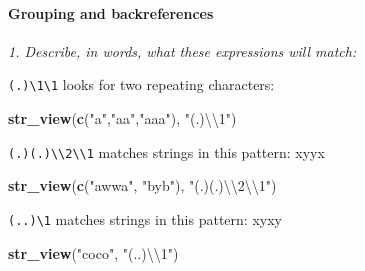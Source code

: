 \documentclass[]{article}
\newenvironment{Shaded}{\begin{snugshade}}{\end{snugshade}}
\newcommand{\KeywordTok}[1]{\textcolor[rgb]{0.13,0.29,0.53}{\textbf{#1}}}
\newcommand{\CharTok}[1]{\textcolor[rgb]{0.31,0.60,0.02}{#1}}
\newcommand{\StringTok}[1]{\textcolor[rgb]{0.31,0.60,0.02}{#1}}
\newcommand{\NormalTok}[1]{#1}
\let\oldparagraph\paragraph
\renewcommand{\paragraph}[1]{\oldparagraph{#1}\mbox{}}
\theoremstyle{definition}
\theoremstyle{definition}
\theoremstyle{definition}
\theoremstyle{remark}
\begin{document}
\hypertarget{htmlwidget-b1fa456cd69b221ea832}{}

\paragraph{Grouping and
backreferences}\label{grouping-and-backreferences}

\emph{1. Describe, in words, what these expressions will match:}

\texttt{(.)\textbackslash{}1\textbackslash{}1} looks for two repeating
characters:

\begin{Shaded}
\begin{Highlighting}[]
\KeywordTok{str_view}\NormalTok{(}\KeywordTok{c}\NormalTok{(}\StringTok{"a"}\NormalTok{,}\StringTok{"aa"}\NormalTok{,}\StringTok{"aaa"}\NormalTok{), }\StringTok{"(.)}\CharTok{\textbackslash{}\textbackslash{}}\StringTok{1"}\NormalTok{)}
\end{Highlighting}
\end{Shaded}

\hypertarget{htmlwidget-ad21b85d28c4cd75cbee}{}

\texttt{(.)(.)\textbackslash{}\textbackslash{}2\textbackslash{}\textbackslash{}1}
matches strings in this pattern: xyyx

\begin{Shaded}
\begin{Highlighting}[]
\KeywordTok{str_view}\NormalTok{(}\KeywordTok{c}\NormalTok{(}\StringTok{"awwa"}\NormalTok{, }\StringTok{"byb"}\NormalTok{), }\StringTok{"(.)(.)}\CharTok{\textbackslash{}\textbackslash{}}\StringTok{2}\CharTok{\textbackslash{}\textbackslash{}}\StringTok{1"}\NormalTok{)}
\end{Highlighting}
\end{Shaded}

\hypertarget{htmlwidget-36d0fdaba88c970ccf0b}{}

\texttt{(..)\textbackslash{}1} matches strings in this pattern: xyxy

\begin{Shaded}
\begin{Highlighting}[]
\KeywordTok{str_view}\NormalTok{(}\StringTok{"coco"}\NormalTok{, }\StringTok{"(..)}\CharTok{\textbackslash{}\textbackslash{}}\StringTok{1"}\NormalTok{)}
\end{Highlighting}
\end{Shaded}

\hypertarget{htmlwidget-8c087ccc4c386c52f26b}{}
\end{document}
